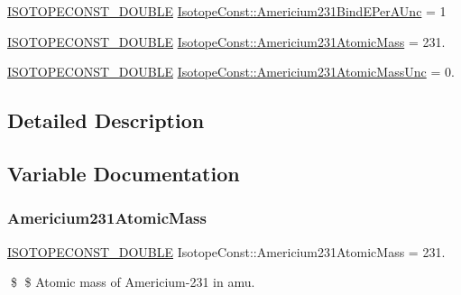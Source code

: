 \begin{DoxyCompactItemize}
\mbox{\hyperlink{group___isotope_const-_macros_ga8f45a7272ce02c0b4c65c44636ed719a}{I\+S\+O\+T\+O\+P\+E\+C\+O\+N\+S\+T\+\_\+\+D\+O\+U\+B\+LE}} \mbox{\hyperlink{group___isotope_const-_americium-_am231_ga38c3b95063652729b2b9a56885812735}{Isotope\+Const\+::\+Americium231\+Bind\+E\+Per\+A\+Unc}} = 1
\item 
\mbox{\hyperlink{group___isotope_const-_macros_ga8f45a7272ce02c0b4c65c44636ed719a}{I\+S\+O\+T\+O\+P\+E\+C\+O\+N\+S\+T\+\_\+\+D\+O\+U\+B\+LE}} \mbox{\hyperlink{group___isotope_const-_americium-_am231_ga374b677503d64530388cfef234a4a6e9}{Isotope\+Const\+::\+Americium231\+Atomic\+Mass}} = 231.
\item 
\mbox{\hyperlink{group___isotope_const-_macros_ga8f45a7272ce02c0b4c65c44636ed719a}{I\+S\+O\+T\+O\+P\+E\+C\+O\+N\+S\+T\+\_\+\+D\+O\+U\+B\+LE}} \mbox{\hyperlink{group___isotope_const-_americium-_am231_ga936397452a433dc042ccf8749ded1283}{Isotope\+Const\+::\+Americium231\+Atomic\+Mass\+Unc}} = 0.
\end{DoxyCompactItemize}


\subsection{Detailed Description}


\subsection{Variable Documentation}
\mbox{\label{group___isotope_const-_americium-_am231_ga374b677503d64530388cfef234a4a6e9}} 
\subsubsection{\texorpdfstring{Americium231\+Atomic\+Mass}{Americium231AtomicMass}}
{\footnotesize\ttfamily \mbox{\hyperlink{group___isotope_const-_macros_ga8f45a7272ce02c0b4c65c44636ed719a}{I\+S\+O\+T\+O\+P\+E\+C\+O\+N\+S\+T\+\_\+\+D\+O\+U\+B\+LE}} Isotope\+Const\+::\+Americium231\+Atomic\+Mass = 231.}

\$ \$ Atomic mass of Americium-\/231 in amu. \mbox{\label{group___isotope_const-_americium-_am231_ga936397452a433dc042ccf8749ded1283}} 
